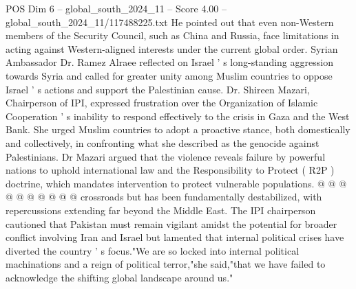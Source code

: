 \begin{textsample}{POS Dim 6 – global\_south\_2024\_11 – Score 4.00 – global\_south\_2024\_11/117488225.txt}
He pointed out that even non-Western members of the Security Council, such as China and Russia, face limitations in acting against Western-aligned interests under the current global order.
Syrian Ambassador Dr.
Ramez Alraee reflected on Israel ' s long-standing aggression towards Syria and called for greater unity among Muslim countries to oppose Israel ' s actions and support the Palestinian cause.
Dr.
Shireen Mazari, Chairperson of IPI, expressed frustration over the Organization of Islamic Cooperation ' s inability to respond effectively to the crisis in Gaza and the West Bank.
She urged Muslim countries to adopt a proactive stance, both domestically and collectively, in confronting what she described as the genocide against Palestinians.
Dr Mazari argued that the violence reveals failure by powerful nations to uphold international law and the Responsibility to Protect ( R2P ) doctrine, which mandates intervention to protect vulnerable populations. @ @ @ @ @ @ @ @ @ @ crossroads but has been fundamentally destabilized, with repercussions extending far beyond the Middle East.
The IPI chairperson cautioned that Pakistan must remain vigilant amidst the potential for broader conflict involving Iran and Israel but lamented that internal political crises have diverted the country ' s focus."We are so locked into internal political machinations and a reign of political terror,"she said,"that we have failed to acknowledge the shifting global landscape around us."

\end{textsample}
